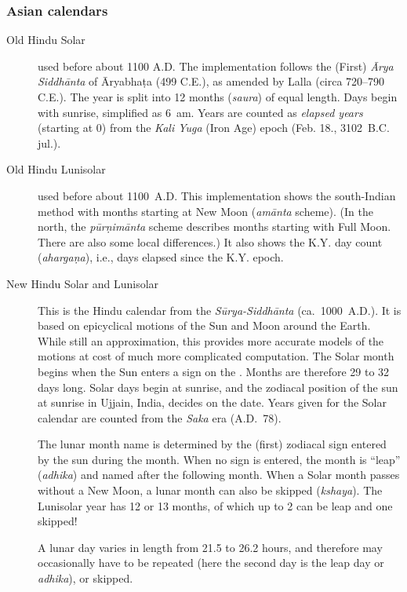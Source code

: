 \subsubsection{Asian calendars}
\begin{description}
\item[Old Hindu Solar] used before about 1100 A.D. The implementation
  follows the (First) \emph{\=Arya Siddh\=anta} of \=Aryabha\d{t}a
  (499 C.E.), as amended by Lalla (circa 720--790 C.E.).  The year is
  split into 12 months (\emph{saura}) of equal length.  Days begin
  with sunrise, simplified as 6~am. Years are counted as \emph{elapsed years} (starting at 0) from the
  \emph{Kali Yuga} (Iron Age) epoch (Feb. 18., 3102~B.C. jul.).
\item[Old Hindu Lunisolar] used before about 1100~A.D. 
  This implementation shows the south-Indian method 
  with months starting at New Moon (\emph{am\=anta} scheme). 
  (In the north, the \emph{p\=ur\d{n}im\=anta} scheme describes months 
  starting with Full Moon. There are also some local differences.) 
  It also shows the K.Y. day count (\emph{aharga\d{n}a}), i.e., days elapsed since the K.Y. epoch.
\item[New Hindu Solar and Lunisolar] This is the Hindu
  calendar from the \emph{S\=urya-Siddh\=anta}
  (ca.~1000~A.D.). It is based on epicyclical motions of the Sun and
  Moon around the Earth. While still an approximation, this provides
  more accurate models of the motions at cost of much more complicated
  computation.  The Solar month begins when the Sun enters a sign on
  the . Months are
  therefore 29 to 32 days long. Solar days begin at sunrise, and the
  zodiacal position of the sun at sunrise in Ujjain, India, decides on
  the date.
  Years given for the Solar calendar are counted from the \emph{Saka}
  era (A.D.~78).
  
  The lunar month name is determined by the (first) zodiacal sign
  entered by the sun during the month. When no sign is entered, the
  month is ``leap'' (\emph{adhika}) and named after the following
  month. When a Solar month passes without a New Moon, a lunar month
  can also be skipped (\emph{kshaya}).  The Lunisolar year has 12 or
  13 months, of which up to 2 can be leap and one skipped!

  A lunar day varies in length from 21.5 to 26.2 hours, and therefore
  may occasionally have to be repeated (here the second day is the
  leap day or \emph{adhika}), or skipped.


\end{description}
